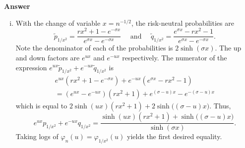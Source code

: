\documentclass[11pt]{article}
\newenvironment{hwanswer}
    {
        \vspace{2mm}
        {\bfseries Answer}
        \vspace{-\abovedisplayskip}
        \begin{center}
            \begin{tcolorbox}[
                width=0.95\textwidth,
                colback=white,
                colframe=white,
                opacityback=0,
                opacityframe=0,
                boxrule=0pt,
                frame hidden,
                breakable,
                before upper={\parindent15pt} %
            ]
            \lineskip=0pt %
    }
    {
        \end{tcolorbox}
        \end{center}
        \vspace{4mm}
    }
\begin{document}
\begin{hwanswer}
\begin{enumerate}[(i)]
            \item With the change of variable $x = n^{-1/2}$, the risk-neutral probabilities
            are
            \[
                \tilde{p}_{1/x^2}
                =
                \frac{
                    r x^2 + 1 - e^{-\sigma x}
                }{
                    e^{\sigma x} - e^{-\sigma x}
                }
                \quad \text{ and } \quad
                \tilde{q}_{1/x^2}
                =
                \frac{
                    e^{\sigma x} - r x^2 - 1
                }{
                    e^{\sigma x} - e^{-\sigma x}
                }.
            \]
            Note the denominator of each of the probabilities is $2 \sinh(\sigma x)$. The
            up and down factors are $e^{ux}$ and $e^{-ux}$ respectively. The numerator
            of the expression $e^{ux} \tilde{p}_{1/x^2} + e^{-ux} \tilde{q}_{1/x^2}$ is
            \[
                \begin{multlined}
                    e^{ux} \left( r x^2 + 1 - e^{-\sigma x} \right)
                    +
                    e^{-ux} \left( e^{\sigma x} - r x^2 - 1\right)
                    \\
                    =
                    \left(
                        e^{ux} - e^{-ux}
                    \right)
                    (r x^2 + 1)
                    +
                    e^{(\sigma - u)x} - e^{-(\sigma-u)x}
                \end{multlined}
            \]
            which is equal to $2 \sinh(ux)(r x^2 + 1) + 2 \sinh\big( (\sigma-u) x \big)$.
            Thus,
            \[
                e^{ux} p_{1/x^2} + e^{-ux} q_{1/x^2}
                =
                \frac{
                    \sinh(ux)(r x^2 + 1) + \sinh\big( (\sigma-u) x \big)
                }{
                    \sinh(\sigma x)
                }.
            \]
            Taking logs of $\varphi_{n}(u) = \varphi_{1/x^2}(u)$ yields the first desired
            equality.


\end{enumerate}
\end{hwanswer}
\end{document}
